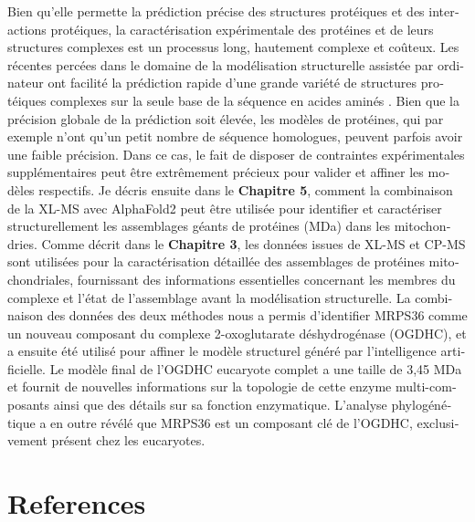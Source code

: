 \begin{otherlanguage}{french}
    Bien qu'elle permette la prédiction précise des structures protéiques et des interactions protéiques, la caractérisation expérimentale des protéines et de leurs structures complexes est un processus long, hautement complexe et coûteux. Les récentes percées dans le domaine de la modélisation structurelle assistée par ordinateur ont facilité la prédiction rapide d'une grande variété de structures protéiques complexes sur la seule base de la séquence en acides aminés \cite{RN5, RN4}. Bien que la précision globale de la prédiction soit élevée, les modèles de protéines, qui par exemple n'ont qu'un petit nombre de séquence homologues, peuvent parfois avoir une faible précision. Dans ce cas, le fait de disposer de contraintes expérimentales supplémentaires peut être extrêmement précieux pour valider et affiner les modèles respectifs.  Je décris ensuite dans le \textbf{Chapitre 5}, comment la combinaison de la XL-MS avec AlphaFold2 \cite{RN4} peut être utilisée pour identifier et caractériser structurellement les assemblages géants de protéines (MDa) dans les mitochondries. Comme décrit dans le \textbf{Chapitre 3}, les données issues de XL-MS et CP-MS sont utilisées pour la caractérisation détaillée des assemblages de protéines mitochondriales, fournissant des informations essentielles concernant les membres du complexe et l'état de l'assemblage avant la modélisation structurelle. La combinaison des données des deux méthodes nous a permis d'identifier MRPS36 comme un nouveau composant du complexe 2-oxoglutarate déshydrogénase (OGDHC), et a ensuite été utilisé pour affiner le modèle structurel généré par l'intelligence artificielle. Le modèle final de l'OGDHC eucaryote complet a une taille de 3,45 MDa et fournit de nouvelles informations sur la topologie de cette enzyme multi-composants ainsi que des détails sur sa fonction enzymatique. L'analyse phylogénétique a en outre révélé que MRPS36 est un composant clé de l'OGDHC, exclusivement présent chez les eucaryotes.
\end{otherlanguage}
\clearpage
\section*{References}


\stopthumb
